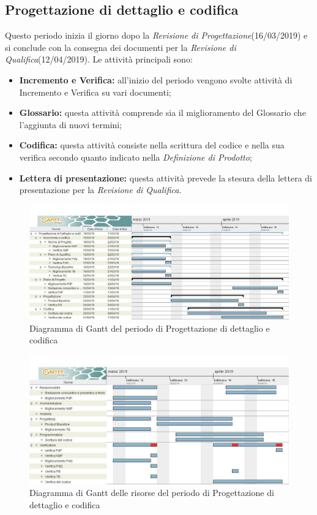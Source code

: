 \subsection{Progettazione di dettaglio e codifica}
Questo periodo inizia il giorno dopo la \textit{Revisione di Progettazione}(16/03/2019) e si conclude
con la consegna dei documenti per la \textit{Revisione di Qualifica}(12/04/2019). Le attività principali sono:
\begin{itemize}
	\item{\textbf{Incremento e Verifica:} all’inizio del periodo vengono svolte attività di Incremento e Verifica su vari documenti;}
	\item{\textbf{Glossario:} questa attività comprende sia il miglioramento del Glossario che l’aggiunta di nuovi termini;}
	\item{\textbf{Codifica:} questa attività consiste nella scrittura del codice e nella sua verifica secondo quanto indicato nella \textit{Definizione di Prodotto};}
	\item{\textbf{Lettera di presentazione:} questa attività prevede la stesura della lettera di presentazione per la \textit{Revisione di Qualifica}.}
\end{itemize}

\clearpage
\begin{figure}[!htpb]
	\centering
	\includegraphics[width=\textwidth]{Gantt_terza_fase.jpg}
	\caption{Diagramma di Gantt del periodo di Progettazione di dettaglio e codifica}
\end{figure}

\begin{figure}[!htpb]
	\centering
	\includegraphics[width=\textwidth]{Gantt_terza_fase_risorse.jpg}
	\caption{Diagramma di Gantt delle risorse del periodo di Progettazione di dettaglio e codifica}
\end{figure}

